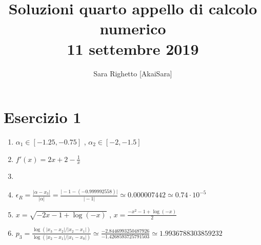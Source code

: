 \documentclass[12pt]{article}
\begin{document}
    \title{Soluzioni quarto appello di calcolo numerico \\ 11 settembre 2019}
    \author{Sara Righetto [AkaiSara]}

    \maketitle

    \section{Esercizio 1}
    \begin{enumerate}
        \item $\alpha _1 \in [-1.25, -0.75]$ , $\alpha _2 \in [-2 , -1.5]$
        \item $f'(x) = 2x +2 - \frac{1}{x}$
        \item 
        \item $\epsilon _R = \frac{\vert \alpha - x_3 \vert} {\vert \alpha \vert} = \frac{\vert -1 - (-0.999992558) \vert} {\vert -1 \vert} \simeq 0.000007442 \simeq 0.74 \cdot 10^{-5}$ 
        \item  $x = \sqrt{-2x -1 + \log(-x)}$ , $x = \frac{-x^2 -1 +\log(-x)}{2}$
        \item $p_3 = \frac{\log( \vert x_3 - x_2 \vert / \vert x_2 - x_1 \vert )}{\log(\vert x_2 - x_1 \vert / \vert x_1 - x_0 \vert)} \simeq \frac{-2.8446993250487926}{-1.4268593725791503} \simeq 1.9936788303859232$
    \end{enumerate}
\end{document}
